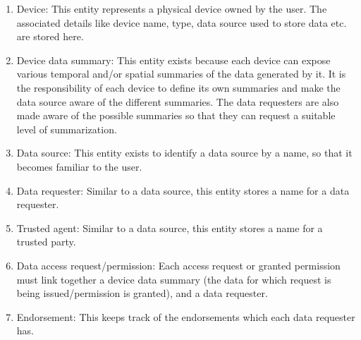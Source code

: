 \begin{enumerate}
	\item Device: This entity represents a physical device owned by the user. The associated details like device name, type, data source used to store data etc. are stored here.

	\item Device data summary: This entity exists because each device can expose various temporal and/or spatial summaries of the data generated by it. It is the responsibility of each device to define its own summaries and make the data source aware of the different summaries. The data requesters are also made aware of the possible summaries so that they can request a suitable level of summarization.

	\item Data source: This entity exists to identify a data source by a name, so that it becomes familiar to the user.

	\item Data requester: Similar to a data source, this entity stores a name for a data requester.

	\item Trusted agent: Similar to a data source, this entity stores a name for a trusted party.

	\item Data access request/permission: Each access request or granted permission must link together a device data summary (the data for which request is being issued/permission is granted), and a data requester.

	\item Endorsement: This keeps track of the endorsements which each data requester has.
\end{enumerate}

